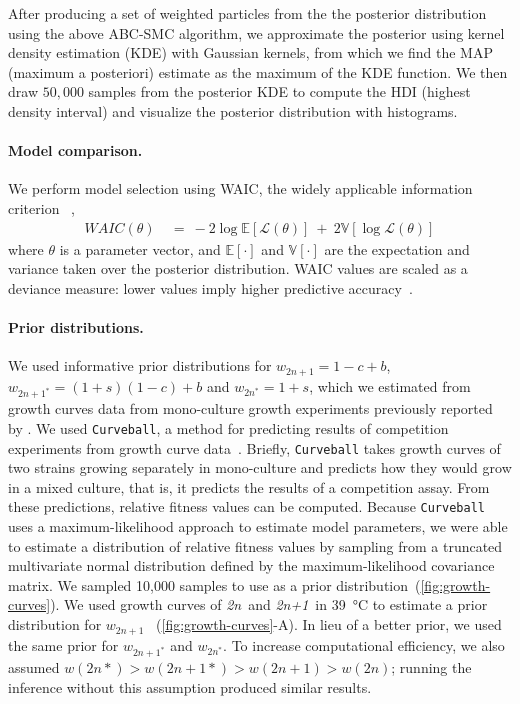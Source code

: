 \documentclass[12pt]{extarticle}
\newcommand{\likelihood}{\mathcal{L}}
\newcommand{\euwt}{\emph{2n}}
\newcommand{\anwt}{\emph{2n+1}}
\begin{document}
After producing a set of weighted particles from the the posterior distribution using the above ABC-SMC algorithm, we approximate the posterior using kernel density estimation (KDE) with Gaussian kernels, from which we find the MAP (maximum a posteriori) estimate as the maximum of the KDE function. We then draw $50,000$ samples from the posterior KDE to compute the HDI (highest density interval) and visualize the posterior distribution with histograms.


\paragraph{Model comparison.} We perform model selection using WAIC, the widely applicable information criterion ~\citep{gelman2013bayesian},
\begin{equation} \label{eq:WAIC}
\begin{aligned}
\mathit{WAIC}(\theta) &\ =\ 
-2\log\mathbb{E}[\likelihood(\theta)]\ +\ 2\mathbb{V}[\log\likelihood(\theta)]
\end{aligned}
\end{equation}
where $\theta$ is a parameter vector, and $\mathbb{E}[\cdot]$ and $\mathbb{V}[\cdot]$ are the expectation and variance taken over the posterior distribution.
WAIC values are scaled as a deviance measure: lower values imply higher predictive accuracy~\citep{Kass1995}.
 
\paragraph{Prior distributions.} We used informative prior distributions for $w_{2n+1}=1-c+b$, $w_{2n+1^*}=(1+s)(1-c)+b$ and $w_{2n^*}=1+s$, which we estimated from growth curves data from mono-culture growth experiments previously reported by \citet[Figs. 3C, 4A, and S2]{Yona2012}.
We used \texttt{Curveball}, a method for predicting results of competition experiments from growth curve data~\citep[\href{https://curveball.yoavram.com}{curveball.yoavram.com}]{Ram2019}. Briefly, \texttt{Curveball} takes growth curves of two strains growing separately in mono-culture and predicts how they would grow in a mixed culture, that is, it predicts the results of a competition assay.
From these predictions, relative fitness values can be computed. Because \texttt{Curveball} uses a maximum-likelihood approach to estimate model parameters, we were able to estimate a distribution of relative fitness values by sampling from a truncated multivariate normal distribution defined by the maximum-likelihood covariance matrix. We sampled 10,000 samples to use as a prior distribution~(\cref{fig:growth-curves}).
We used growth curves of \euwt\ and \anwt\ in \SI{39}{\celsius} to estimate a prior distribution for $w_{2n+1}$ ~(\cref{fig:growth-curves}-A). In lieu of a better prior, we used the same prior for $w_{2n+1^*}$ and $w_{2n^*}$. 
To increase computational efficiency, we also assumed $w(2n*)>w(2n+1*)>w(2n+1)>w(2n)$; running the inference without this assumption produced similar results. 
\end{document}
